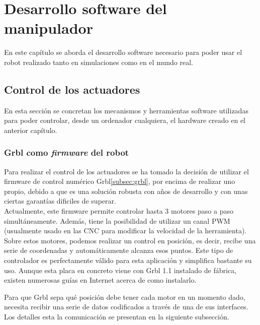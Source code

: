 \chapter{Desarrollo software del manipulador}
\label{cap:capitulo6}

\vspace{1cm}
\noindent En este capítulo se aborda el desarrollo software necesario para poder usar el robot realizado 
tanto en simulaciones como en el mundo real.

\section{Control de los actuadores}
\noindent En esta sección se concretan los mecanismos y herramientas software utilizadas para poder controlar, desde 
un ordenador cualquiera, el hardware creado en el anterior capítulo.

\subsection{Grbl como \textit{firmware} del robot}
\noindent Para realizar el control de los actuadores se ha tomado la decisión de utilizar el 
firmware de control numérico Grbl\ref{subsec:grbl}, por encima 
de realizar uno propio, debido a que es una solución robusta con años de desarrollo y con unas ciertas garantías dificiles de superar.
\\
Actualmente, este firmware permite controlar hasta 3 motores paso a paso simultáneamente. Además, tiene la posibilidad de utilizar 
un canal PWM (usualmente usado en las CNC para modificar la velocidad de la herramienta). Sobre estos motores, podemos realizar 
un control en posición, es decir, recibe una serie de coordenadas y automáticamente alcanza esos puntos. Este tipo de controlador 
es perfectamente válido para esta aplicación y simplifica bastante su uso. Aunque esta placa en concreto viene con Grbl 1.1 instalado 
de fábrica, existen numerosas guías en Internet acerca de como instalarlo.

Para que Grbl sepa qué posición debe tener cada motor en un momento dado, necesita recibir 
una serie de datos codificados a través de una de sus interfaces. Los detalles esta la comunicación 
se presentan en la siguiente subsección.
\newpage
